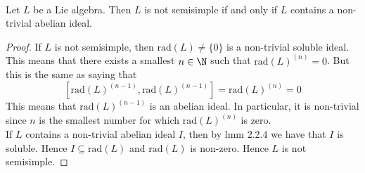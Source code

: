 \documentclass[a4paper]{article}
\begin{document}
\begin{lmm}{}{} \\Let $L$ be a Lie algebra. Then $L$ is not semisimple if and only if $L$ contains a non-trivial abelian ideal. 
\begin{proof}
If $L$ is not semisimple, then $\text{rad}(L)\neq\{0\}$ is a non-trivial soluble ideal. This means that there exists a smallest $n\in\N$ such that $\text{rad}(L)^{(n)}=0$. But this is the same as saying that $$[\text{rad}(L)^{(n-1)},\text{rad}(L)^{(n-1)}]=\text{rad}(L)^{(n)}=0$$ This means that $\text{rad}(L)^{(n-1)}$ is an abelian ideal. In particular, it is non-trivial since $n$ is the smallest number for which $\text{rad}(L)^{(n)}$ is zero. \\

If $L$ contains a non-trivial abelian ideal $I$, then by lmm 2.2.4 we have that $I$ is soluble. Hence $I\subseteq\text{rad}(L)$ and $\text{rad}(L)$ is non-zero. Hence $L$ is not semisimple. 
\end{proof}
\end{lmm}
\end{document}

